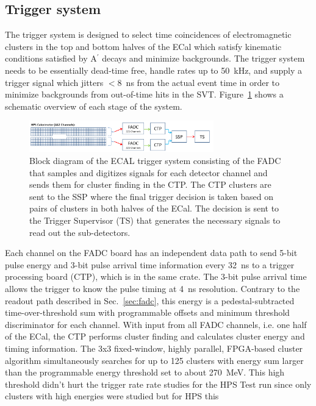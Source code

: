 \documentclass[final,3p,times,twocolumn]{elsarticle}
\newcommand{\Aprime}{A\ensuremath{^\prime}}
\begin{document}
\subsection{Trigger system}
\label{sec:trigger}
The trigger system is designed to select time coincidences of electromagnetic clusters in the top and bottom 
halves of the ECal which satisfy kinematic conditions satisfied by \Aprime{} decays and minimize backgrounds.
The trigger system needs to be essentially dead-time free, handle rates up to 50~kHz, and supply a trigger 
signal which jitters $<8$~ns from the actual event time in order to minimize backgrounds from out-of-time hits in the SVT. 
Figure~\ref{fig:hps_trigger_cal} shows a schematic overview of each stage of the system. 
 \begin{figure}[b]
\begin{center}
 \includegraphics[width=8cm]{hps_trigger_cal}
\caption{\small Block diagram of the ECAL trigger system consisting of the FADC that samples and digitizes 
signals for each detector channel and sends them for cluster finding in the CTP. The CTP clusters are 
sent to the SSP where the final trigger decision is taken based on pairs of clusters in both halves of the 
ECal. The decision is sent to the Trigger Supervisor (TS) that generates the necessary signals to read out 
the sub-detectors.
 \label{fig:hps_trigger_cal}}
\end{center}
 \end{figure}
Each channel on the FADC board has an independent data path to send 5-bit pulse energy and 3-bit 
pulse arrival time information every 32~ns to a trigger processing board (CTP), which is in the same 
crate. The 3-bit pulse arrival time allows the trigger to know the pulse timing at 4~ns resolution. 
Contrary to the readout path 
described in Sec.~\ref{sec:fadc}, this energy is a pedestal-subtracted time-over-threshold sum with 
programmable offsets and minimum threshold discriminator for each channel. With input from all 
FADC channels, i.e. one half of the ECal, the CTP performs cluster finding and calculates cluster 
energy and timing information. The 3x3 fixed-window, highly parallel, FPGA-based cluster 
algorithm simultaneously searches for up to 125 clusters with energy sum larger than 
the programmable energy threshold set to about 270~MeV. This high threshold didn't hurt the trigger rate 
rate studies for the HPS Test run since only clusters with high energies were studied but for HPS this 
\end{document}
